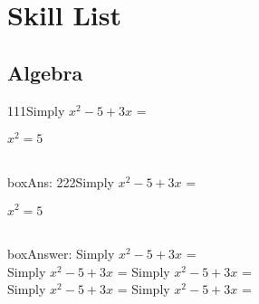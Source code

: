 


\chapter{Skill List}


\section{Algebra}

111Simply $x^2-5+3x$ = \begin{boxAns}[width=10cm]$x^2=5$\end{boxAns}  \\


boxAns: 222Simply $x^2-5+3x$ = \begin{boxAns}$x^2=5$\end{boxAns}  \\


boxAnswer: Simply $x^2-5+3x$ =   \\

Simply $x^2-5+3x$ = 
Simply $x^2-5+3x$ =  \\
Simply $x^2-5+3x$ = 
Simply $x^2-5+3x$ = 







%
%
%
%
%


\setcounter{exercise}{722}

\setcounter{task}{299}


